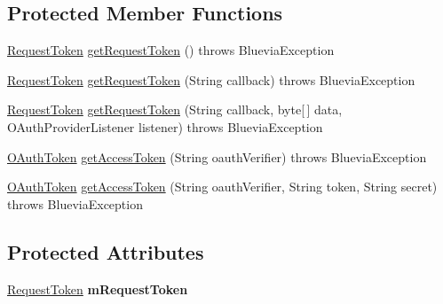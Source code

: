 \subsection*{Protected Member Functions}
\begin{DoxyCompactItemize}
\item 
\hyperlink{classcom_1_1bluevia_1_1commons_1_1connector_1_1http_1_1oauth_1_1RequestToken}{RequestToken} \hyperlink{classcom_1_1bluevia_1_1oauth_1_1client_1_1BVOauthClient_afdcb62994e20e75f977c23d667e65624}{getRequestToken} ()  throws BlueviaException 
\item 
\hyperlink{classcom_1_1bluevia_1_1commons_1_1connector_1_1http_1_1oauth_1_1RequestToken}{RequestToken} \hyperlink{classcom_1_1bluevia_1_1oauth_1_1client_1_1BVOauthClient_abfae01d89a48f9d82ae31f2ee8e8ee20}{getRequestToken} (String callback)  throws BlueviaException 
\item 
\hyperlink{classcom_1_1bluevia_1_1commons_1_1connector_1_1http_1_1oauth_1_1RequestToken}{RequestToken} \hyperlink{classcom_1_1bluevia_1_1oauth_1_1client_1_1BVOauthClient_ad64ba283311a6036eee0ad6e952f0dc6}{getRequestToken} (String callback, byte\mbox{[}$\,$\mbox{]} data, OAuthProviderListener listener)  throws BlueviaException 
\item 
\hyperlink{classcom_1_1bluevia_1_1commons_1_1connector_1_1http_1_1oauth_1_1OAuthToken}{OAuthToken} \hyperlink{classcom_1_1bluevia_1_1oauth_1_1client_1_1BVOauthClient_a39d19282945b281a33a1478d5dbf5073}{getAccessToken} (String oauthVerifier)  throws BlueviaException 
\item 
\hyperlink{classcom_1_1bluevia_1_1commons_1_1connector_1_1http_1_1oauth_1_1OAuthToken}{OAuthToken} \hyperlink{classcom_1_1bluevia_1_1oauth_1_1client_1_1BVOauthClient_afcd5ef6a1fe62b36c34c8d6b23777aa1}{getAccessToken} (String oauthVerifier, String token, String secret)  throws BlueviaException 
\end{DoxyCompactItemize}
\subsection*{Protected Attributes}
\begin{DoxyCompactItemize}
\item 
\hypertarget{classcom_1_1bluevia_1_1oauth_1_1client_1_1BVOauthClient_a9a03fd986e66014919f4cf2c7fcaac52}{
\hyperlink{classcom_1_1bluevia_1_1commons_1_1connector_1_1http_1_1oauth_1_1RequestToken}{RequestToken} {\bfseries mRequestToken}}
\label{classcom_1_1bluevia_1_1oauth_1_1client_1_1BVOauthClient_a9a03fd986e66014919f4cf2c7fcaac52}

\end{DoxyCompactItemize}



